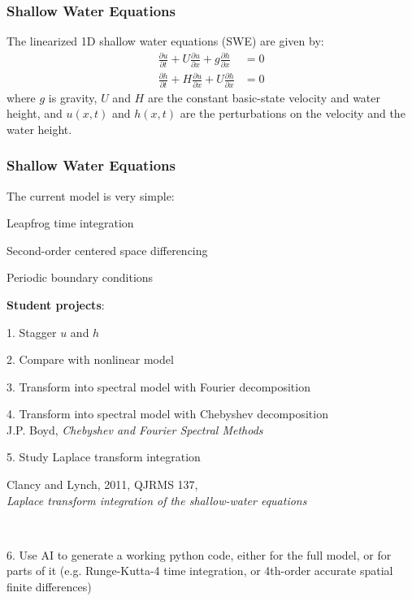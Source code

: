 \documentclass[aspectratio=43,9pt]{beamer}
\begin{document}
%
%
\begin{frame}
	\frametitle{Shallow Water Equations}
	The linearized 1D shallow water equations (SWE) are given by:
	\begin{align*}
		\frac{\partial u}{\partial t}+U\frac{\partial u}{\partial x}+g\frac{\partial h}{\partial x}&=0\\
		\frac{\partial h}{\partial t}+H\frac{\partial u}{\partial x}+U\frac{\partial h}{\partial x}&=0
	\end{align*}
	where $g$ is gravity, $U$ and $H$ are the constant basic-state velocity and water height, and $u(x,t)$ and $h(x,t)$ are the perturbations on the velocity and the water height.
\end{frame}
%
%
\begin{frame}
	\frametitle{Shallow Water Equations}
	The current model is very simple:
	\begin{myitemize}{1ex}
		\item Leapfrog time integration
		\item Second-order centered space differencing
		\item Periodic boundary conditions
	\end{myitemize}
	{\vspace*{4ex}\bfseries Student projects}:
	\begin{myitemize}{1ex}
		\item[1.] Stagger $u$ and $h$
		\item[2.] Compare with nonlinear model
		\item[3.] Transform into spectral model with Fourier decomposition
		\item[4.] Transform into spectral model with Chebyshev decomposition\\[1mm]
			\quad J.P. Boyd, \emph{Chebyshev and Fourier Spectral Methods}\\
		\item[5.] Study Laplace transform integration\\[1mm]
			\quad\parbox{.9\textwidth}{Clancy and Lynch, 2011, QJRMS 137,\\\emph{Laplace transform integration of the shallow-water equations}}\\[1mm]
		\item[6.] Use AI to generate a working python code, either for the full model, or for parts of it (e.g. Runge-Kutta-4 time integration, or 4th-order accurate spatial finite differences)
	\end{myitemize}
\end{frame}
\end{document}
